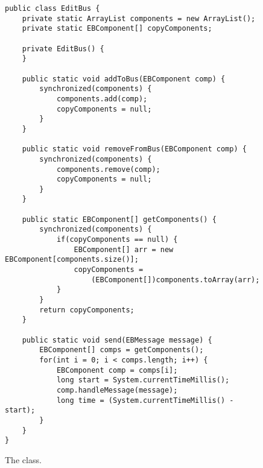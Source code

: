 \begin{figure}[p]
\def\baselinestretch{1}
\begin{lstlisting}
public class EditBus {
    private static ArrayList components = new ArrayList();
    private static EBComponent[] copyComponents;
  
    private EditBus() {
    }
  
    public static void addToBus(EBComponent comp) {
        synchronized(components) {
            components.add(comp);
            copyComponents = null;
        }
    }

    public static void removeFromBus(EBComponent comp) {
        synchronized(components) {
            components.remove(comp);
            copyComponents = null;
        }
    }

    public static EBComponent[] getComponents() {
        synchronized(components) {
            if(copyComponents == null) {
                EBComponent[] arr = new EBComponent[components.size()];
                copyComponents = 
                    (EBComponent[])components.toArray(arr);
            }
        }
        return copyComponents;
    }
  
    public static void send(EBMessage message) {
        EBComponent[] comps = getComponents();
        for(int i = 0; i < comps.length; i++) {
            EBComponent comp = comps[i];
            long start = System.currentTimeMillis();
            comp.handleMessage(message);
            long time = (System.currentTimeMillis() - start);
        }
    }
}
\end{lstlisting}
\caption{The  class.\label{ch2-ex}}
\end{figure}


